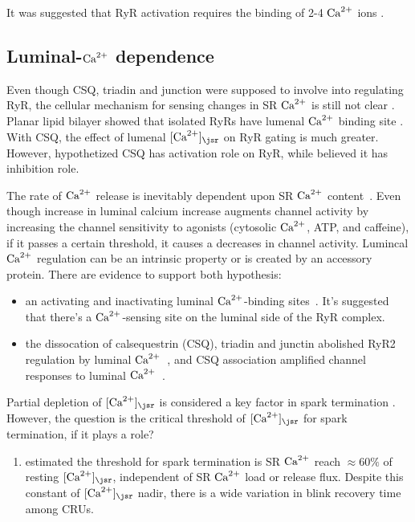 It was suggested that RyR activation requires the binding of 2-4 ${\text{Ca}^{2+}}$ ions
\citep{Sitsapesan1994, Zahradnik1999}.

\subsection{Luminal-${\text{Ca}^{2+}}$ dependence}
\label{sec:RyR_luminal_Calcium}

Even though CSQ, triadin and junction were supposed to involve into
regulating RyR, the cellular mechanism for sensing changes in SR ${\text{Ca}^{2+}}$ is still
not clear \citep{Sobie2012}. Planar lipid bilayer showed that isolated RyRs have
lumenal ${\text{Ca}^{2+}}$ binding site \citep{laver2007}. With CSQ, the effect of lumenal
$[\Ca]_\jsr$ on RyR gating is much greater. However, \citep{qin2008}
hypothetized CSQ has activation role on RyR, while \citep{Gyorke2004} believed
it has inhibition role.

The rate of ${\text{Ca}^{2+}}$ release is inevitably dependent upon SR ${\text{Ca}^{2+}}$
content~\citep{Donoso1995,Lamb2001}. Even though increase in luminal calcium
increase augments channel activity by increasing the channel sensitivity to
agonists (cytosolic ${\text{Ca}^{2+}}$, ATP, and caffeine), if it passes a certain threshold,
it causes a decreases in channel activity. Lumincal ${\text{Ca}^{2+}}$ regulation can be an
intrinsic property or is created by an accessory protein. There are evidence to
support both hypothesis:
\begin{itemize}
  \item an activating and inactivating luminal ${\text{Ca}^{2+}}$-binding
sites~\citep{ching2000}. It's suggested that there's a ${\text{Ca}^{2+}}$-sensing site on the
luminal side of the RyR complex.

  \item the dissocation of calsequestrin (CSQ), triadin and junctin abolished
  RyR2 regulation by luminal ${\text{Ca}^{2+}}$~\citep{Gyorke2004}, and CSQ association
  amplified channel responses to luminal ${\text{Ca}^{2+}}$~\citep{Beard2005}.
\end{itemize}

Partial depletion of $[\Ca]_\jsr$  is considered a key factor in spark
termination \citep{7,11-13}. However, the question is the critical threshold
of $[\Ca]_\jsr$ for spark termination, if it plays a role? 
\begin{enumerate}
  \item \citep{zima2008tcas} estimated the threshold for spark termination is SR
  ${\text{Ca}^{2+}}$ reach $\approx 60\%$ of resting $[\Ca]_\jsr$, independent of SR ${\text{Ca}^{2+}}$
  load or release flux. Despite this constant of $[\Ca]_\jsr$ nadir, there is a
  wide variation in blink recovery time among CRUs.
\end{enumerate}


